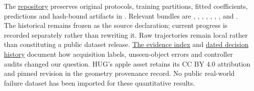 \documentclass[10pt,letterpaper]{article}
\newcommand{\projecturl}{https://github.com/nilakarthikesan/grasp-failure-recovery}
\begin{document}
The \href{\projecturl}{repository} preserves original protocols, training
partitions, fitted coefficients, predictions and hash-bound artifacts in
. Relevant bundles are
, ,
, ,
, ,
,  and
.
The historical  remains frozen as the source
declaration; current progress is recorded separately rather than rewriting it.
Raw trajectories remain local rather than constituting a public dataset release.
\href{../PAPER_PROGRESS.md}{The evidence index} and
\href{../RESEARCH_DECISIONS.md}{dated decision history} document how acquisition
labels, unseen-object errors and controller audits changed our question.
HUG's apple asset retains its CC BY 4.0 attribution and pinned revision in the
geometry provenance record. No public real-world failure dataset has been
imported for these quantitative results.
\end{document}
